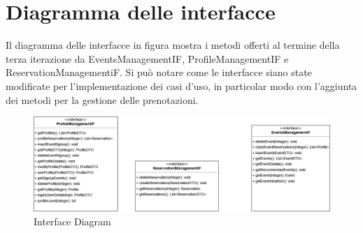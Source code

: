 \section{Diagramma delle interfacce}

Il diagramma delle interfacce in figura mostra i metodi offerti al termine della terza iterazione
da EventsManagementIF, ProfileManagementIF e ReservationManagementiF. 
Si può notare come le interfacce siano state modificate per l'implementazione dei casi d'uso, in particolar modo con l'aggiunta dei metodi
per la gestione delle prenotazioni.


\begin{figure}[h!]
    \centering
    \includegraphics[width=1\textwidth]{Iterazione 3/images/IF.png}
    \caption{Interface Diagram}
  \end{figure}